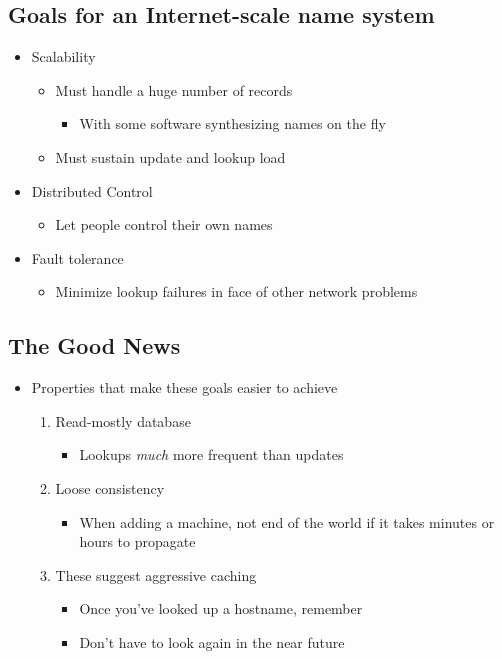 \subsection{Goals for an Internet-scale name system}
\begin{itemize}[nosep]
    \item Scalability
          \begin{itemize}[nosep]
              \item Must handle a huge number of records
                    \begin{itemize}[nosep]
                        \item With some software synthesizing names on the fly
                    \end{itemize}
              \item Must sustain update and lookup load
          \end{itemize}
    \item Distributed Control
          \begin{itemize}[nosep]
              \item Let people control their own names
          \end{itemize}
    \item Fault tolerance
          \begin{itemize}[nosep]
              \item Minimize lookup failures in face of other network problems
          \end{itemize}
\end{itemize}
\subsection{The Good News}
\begin{itemize}[nosep]
    \item Properties that make these goals easier to achieve
          \begin{enumerate}[nosep]
              \item Read-mostly database
                    \begin{itemize}[nosep]
                        \item Lookups \emph{much} more frequent than updates
                    \end{itemize}
              \item Loose consistency
                    \begin{itemize}[nosep]
                        \item When adding a machine, not end of the world if it takes minutes or hours to propagate
                    \end{itemize}
              \item These suggest aggressive caching
                    \begin{itemize}[nosep]
                        \item Once you've looked up a hostname, remember
                        \item Don't have to look again in the near future
                    \end{itemize}
          \end{enumerate}
\end{itemize}
